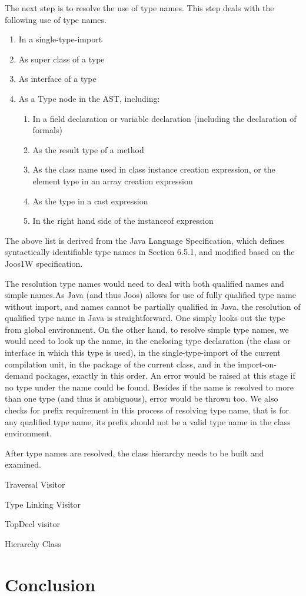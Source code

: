 \documentclass[a4paper, notitlepage]{report}
\begin{document}
The next step is to resolve the use of type names. This step deals with the following use of type names.
\begin{enumerate}
\item In a single-type-import
\item As super class of a type
\item As interface of a type
\item As a Type node in the AST, including:
	\begin{enumerate}
	\item In a field declaration or variable declaration (including the declaration of formals)
	\item As the result type of a method
	\item As the class name used in class instance creation expression, or the element type in an array creation expression
	\item As the type in a cast expression
	\item In the right hand side of the instanceof expression
	\end{enumerate}
\end{enumerate}
The above list is derived from the Java Language Specification, which defines syntactically identifiable type names in Section 6.5.1, and modified based on the Joos1W specification. 

The resolution type names would need to deal with both qualified names and simple names.As Java (and thus Joos) allows for use of fully qualified type name without import, and names cannot be partially qualified in Java, the resolution of qualified type name in Java is straightforward. One simply looks out the type from global environment. On the other hand, to resolve simple type names, we would need to look up the name, in the enclosing type declaration (the class or interface in which this type is used), in the single-type-import of the current compilation unit, in the package of the current class, and in the import-on-demand packages, exactly in this order. An error would be raised at this stage if no type under the name could be found. Besides if the name is resolved to more than one type (and thus is ambiguous), error would be thrown too. We also checks for prefix requirement in this process of resolving type name, that is for any qualified type name, its prefix should not be a valid type name in the class environment.

After type names are resolved, the class hierarchy needs to be built and examined.






Traversal Visitor

Type Linking Visitor

TopDecl visitor

Hierarchy Class




\chapter{Conclusion}



\end{document}

